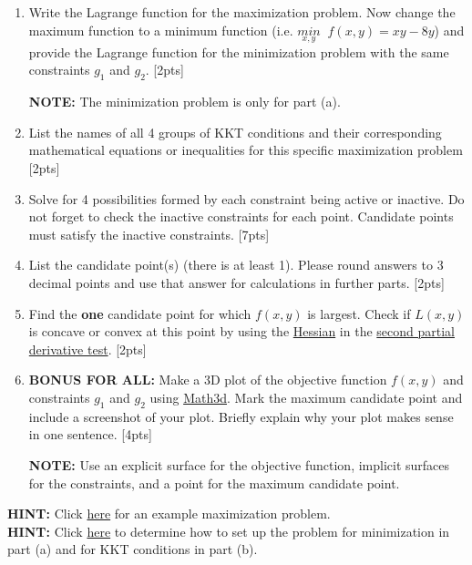 \documentclass{article}
\begin{document}
\begin{enumerate}[label=(\alph*)]
    \item Write the Lagrange function for the maximization problem. Now change the maximum function to a minimum function (i.e. $\underset{x,y}{min} \;\; f(x,y) = xy - 8y$) and provide the Lagrange function for the minimization problem with the same constraints $g_1$ and $g_2$.  [2pts]
        \par\textbf{NOTE:} The minimization problem is only for part (a).
    \item List the names of all 4 groups of KKT conditions and their corresponding mathematical equations or inequalities for this specific maximization problem [2pts]
    \item Solve for 4 possibilities formed by each constraint being active or inactive. Do not forget to check the inactive constraints for each point. Candidate points must satisfy the inactive constraints.   [7pts]
    \item List the candidate point(s) (there is at least 1). Please round answers to 3 decimal points and use that answer for calculations in further parts. [2pts]
    \item Find the \textbf{one} candidate point for which $f(x,y)$ is largest. Check if $L(x,y)$ is concave or convex at this point by using the \href{https://www.khanacademy.org/math/multivariable-calculus/applications-of-multivariable-derivatives/quadratic-approximations/a/the-hessian}{Hessian} in the \href{https://www.khanacademy.org/math/multivariable-calculus/applications-of-multivariable-derivatives/optimizing-multivariable-functions/a/second-partial-derivative-test}{second partial derivative test}.  [2pts]
    \item \textbf{BONUS FOR ALL:} Make a 3D plot of the objective function $f(x,y)$ and constraints $g_1$ and $g_2$ using \href{https://www.math3d.org/}{Math3d}. Mark the maximum candidate point and include a screenshot of your plot. Briefly explain why your plot makes sense in one sentence. [4pts]
    \par\textbf{NOTE:} Use an explicit surface for the objective function, implicit surfaces for the constraints, and a point for the maximum candidate point. \\
\end{enumerate}

\noindent\textbf{HINT:} Click \href{https://www.youtube.com/watch?v=TqN-8fxYUYY}{here} for an example maximization problem. \\
\noindent\textbf{HINT:} Click \href{https://en.wikipedia.org/wiki/Karush-Kuhn-Tucker_conditions#Nonlinear_optimization_problem}{here} to determine how to set up the problem for minimization in part (a) and for KKT conditions in part (b).\\
\end{document}
